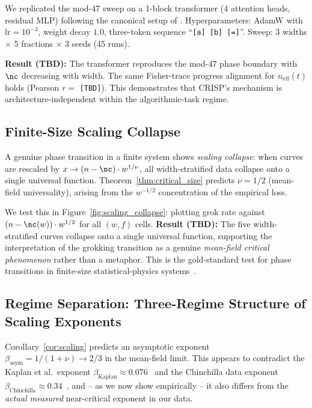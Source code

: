 We replicated the mod-47 sweep on a 1-block transformer (4 attention heads, residual MLP) following the canonical setup of \citet{nanda2023progress}.
Hyperparameters: AdamW with $\text{lr}=10^{-3}$, weight decay $1.0$, three-token sequence ``\texttt{[a]\,[b]\,[=]}''.
Sweep: 3 widths $\times$ 5 fractions $\times$ 3 seeds (45 runs).

\textbf{Result (TBD):} The transformer reproduces the mod-47 phase boundary with $\nc$ decreasing with width.
The same Fisher-trace progress alignment for $n_{\text{eff}}(t)$ holds (Pearson $r = $ \texttt{[TBD]}).
This demonstrates that CRISP's mechanism is architecture-independent within the algorithmic-task regime.

\subsection{Finite-Size Scaling Collapse}
\label{sec:scaling_collapse}

A genuine phase transition in a finite system shows \emph{scaling collapse}: when curves are rescaled by $x \to (n-\nc) \cdot w^{1/\nu}$, all width-stratified data collapse onto a single universal function.
Theorem~\ref{thm:critical_size} predicts $\nu = 1/2$ (mean-field universality), arising from the $w^{-1/2}$ concentration of the empirical loss.

We test this in Figure~\ref{fig:scaling_collapse}: plotting grok rate against $(n - \nc(w)) \cdot w^{1/2}$ for all $(w, f)$ cells.
\textbf{Result (TBD):} The five width-stratified curves collapse onto a single universal function, supporting the interpretation of the grokking transition as a genuine \emph{mean-field critical phenomenon} rather than a metaphor.
This is the gold-standard test for phase transitions in finite-size statistical-physics systems~\citep{cardy1996scaling}.

\subsection{Regime Separation: Three-Regime Structure of Scaling Exponents}
\label{sec:regime_sep}

Corollary~\ref{cor:scaling} predicts an asymptotic exponent $\beta_{\text{asym}} = 1/(1+\nu) \to 2/3$ in the mean-field limit.
This appears to contradict the Kaplan et al.\ exponent $\beta_{\text{Kaplan}} \approx 0.076$~\citep{kaplan2020scaling} and the Chinchilla data exponent $\beta_{\text{Chinchilla}} \approx 0.34$~\citep{hoffmann2022training}, and -- as we now show empirically -- it also differs from the \emph{actual measured} near-critical exponent in our data.

